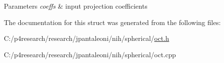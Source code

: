 \begin{DoxyParams}{\-Parameters}
{\em coeffs} & input projection coefficients \\
\hline
\end{DoxyParams}


\-The documentation for this struct was generated from the following files\-:\begin{DoxyCompactItemize}
\item 
\-C\-:/p4research/research/jpantaleoni/nih/spherical/\hyperlink{oct_8h}{oct.\-h}\item 
\-C\-:/p4research/research/jpantaleoni/nih/spherical/oct.\-cpp\end{DoxyCompactItemize}
